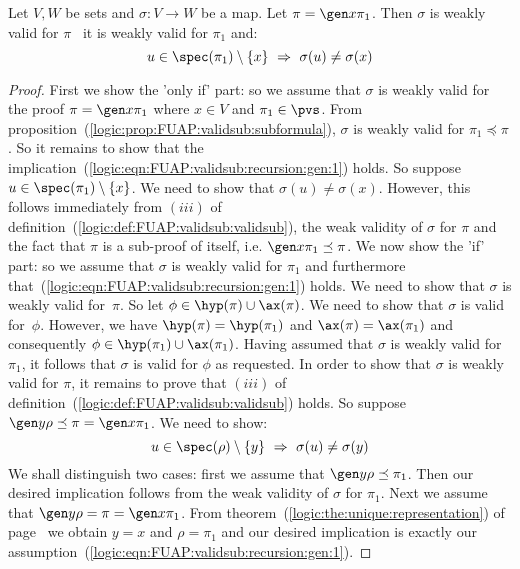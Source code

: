 \begin{prop}\label{logic:prop:FUAP:validsub:recursion:gen}
Let $V, W$ be sets and $\sigma:V\to W$ be a map. Let $\pi=\gen
x\pi_{1}$. Then $\sigma$ is weakly valid for $\pi$ \ifand\ it is
weakly valid for $\pi_{1}$ and:
    \begin{equation}\label{logic:eqn:FUAP:validsub:recursion:gen:1}
    u\in\spec(\pi_{1})\setminus\{x\}\ \Rightarrow\
    \sigma(u)\neq\sigma(x)
    \end{equation}
\end{prop}
\begin{proof}
First we show the 'only if' part: so we assume that $\sigma$ is
weakly valid for the proof $\pi=\gen x\pi_{1}$ where $x\in V$ and
$\pi_{1}\in\pvs$. From
proposition~(\ref{logic:prop:FUAP:validsub:subformula}), $\sigma$ is
weakly valid for $\pi_{1}\preceq\pi$. So it remains to show that the
implication~(\ref{logic:eqn:FUAP:validsub:recursion:gen:1}) holds.
So suppose $u\in\spec(\pi_{1})\setminus\{x\}$. We need to show that
$\sigma(u)\neq\sigma(x)$. However, this follows immediately from
$(iii)$ of definition~(\ref{logic:def:FUAP:validsub:validsub}), the
weak validity of $\sigma$ for $\pi$ and the fact that $\pi$ is a
sub-proof of itself, i.e. $\gen x\pi_{1}\preceq\pi$. We now show the
'if' part: so we assume that $\sigma$ is weakly valid for $\pi_{1}$
and furthermore that~(\ref{logic:eqn:FUAP:validsub:recursion:gen:1})
holds. We need to show that $\sigma$ is weakly valid for~$\pi$. So
let $\phi\in\hyp(\pi)\cup\ax(\pi)$. We need to show that $\sigma$ is
valid for~$\phi$. However, we have $\hyp(\pi)=\hyp(\pi_{1})$ and
$\ax(\pi)=\ax(\pi_{1})$ and consequently
$\phi\in\hyp(\pi_{1})\cup\ax(\pi_{1})$. Having assumed that $\sigma$
is weakly valid for $\pi_{1}$, it follows that $\sigma$ is valid for
$\phi$ as requested. In order to show that $\sigma$ is weakly valid
for $\pi$, it remains to prove that $(iii)$ of
definition~(\ref{logic:def:FUAP:validsub:validsub}) holds. So
suppose $\gen y\rho\preceq\pi=\gen x\pi_{1}$. We need to show:
    \[
    u\in\spec(\rho)\setminus\{y\}\ \Rightarrow\ \sigma(u)\neq\sigma(y)
    \]
We shall distinguish two cases: first we assume that $\gen
y\rho\preceq\pi_{1}$. Then our desired implication follows from the
weak validity of $\sigma$ for $\pi_{1}$. Next we assume that $\gen
y\rho=\pi=\gen x\pi_{1}$. From
theorem~(\ref{logic:the:unique:representation}) of
page~\pageref{logic:the:unique:representation} we obtain $y=x$ and
$\rho=\pi_{1}$ and our desired implication is exactly our
assumption~(\ref{logic:eqn:FUAP:validsub:recursion:gen:1}).
\end{proof}


